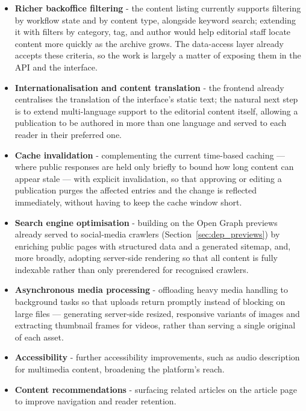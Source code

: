 \begin{itemize}
      \item \textbf{Richer backoffice filtering} - the content listing currently supports
            filtering by workflow state and by content type, alongside keyword search;
            extending it with filters by category, tag, and author would help editorial
            staff locate content more quickly as the archive grows. The data-access layer
            already accepts these criteria, so the work is largely a matter of exposing them
            in the API and the interface.

      \item \textbf{Internationalisation and content translation} - the frontend already
            centralises the translation of the interface's static text; the natural next
            step is to extend multi-language support to the editorial content itself,
            allowing a publication to be authored in more than one language and served to
            each reader in their preferred one.

      \item \textbf{Cache invalidation} - complementing the current time-based caching ---
            where public responses are held only briefly to bound how long content can
            appear stale --- with explicit invalidation, so that approving or editing a
            publication purges the affected entries and the change is reflected immediately,
            without having to keep the cache window short.

      \item \textbf{Search engine optimisation} - building on the Open Graph previews
            already served to social-media crawlers (Section~\ref{sec:dep_previews}) by
            enriching public pages with structured data and a generated sitemap, and,
            more broadly, adopting server-side rendering so that all content is fully
            indexable rather than only prerendered for recognised crawlers.

      \item \textbf{Asynchronous media processing} - offloading heavy media handling to
            background tasks so that uploads return promptly instead of blocking on large
            files --- generating server-side resized, responsive variants of images and
            extracting thumbnail frames for videos, rather than serving a single original of
            each asset.

      \item \textbf{Accessibility} - further accessibility improvements, such as audio
            description for multimedia content, broadening the platform's reach.

      \item \textbf{Content recommendations} - surfacing related articles on the article
            page to improve navigation and reader retention.
\end{itemize}

